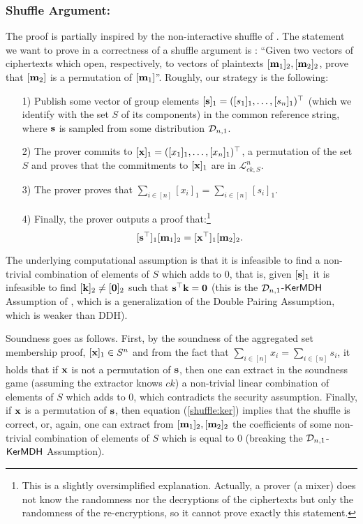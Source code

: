   \subsubsection{Shuffle Argument:} The proof is partially inspired by the non-interactive shuffle of \cite{AC:GroLu07}. The statement we want to prove in a correctness of a shuffle argument is : ``Given two vectors of ciphertexts which open, respectively, to vectors of plaintexts $[\mathbf{m}_1]_2, [\mathbf{m}_2]_2$, prove that 
 $[\mathbf{m}_2]$ is a permutation of $[\mathbf{m}_1]$''.  Roughly, our strategy is the following:  
\begin{itemize}
\item[1)] Publish some vector of group elements $[\mathbf{s}]_1 =([s_1]_1,\ldots,[s_n]_1)^\top$ (which we identify with the set $S$ of its components) in the common reference string, where $\mathbf{s}$ is sampled from some distribution $\mathcal{D}_{n,1}$.
\item[2)] The prover commits to $[\mathbf{x}]_1=([x_1]_1,\ldots,[x_n]_1)^\top$, a permutation of the set $S$ and proves that the commitments to $[\mathbf{x}]_1$ are in $\mathcal{L}^{n}_{ck,S}$.
\item[3)] The prover proves that $\sum_{i \in [n]} [x_i]_1 =\sum_{i \in [n]} [s_i]_1$.
\item[4)] Finally, the prover outputs a proof that:\footnote{This is a slightly oversimplified explanation. 
Actually, a prover (a mixer) does not know the randomness nor the decryptions of the ciphertexts but only the randomness of the re-encryptions, so it cannot prove exactly this statement.} 
\begin{equation}\label{shuffle:ker}[\mathbf{s}^{\top}]_1 [\mathbf{m}_1]_2 =[\mathbf{x}^{\top}]_1 [\mathbf{m}_2]_2.
\end{equation}
\end{itemize}
The underlying computational assumption is that it is infeasible to find a non-trivial combination of elements of $S$ which adds to $0$, that is, given $[\mathbf{s}]_1$ it is infeasible to find $[\mathbf{k}]_2 \neq [\mathbf{0}]_2$ such that
$\mathbf{s}^{\top} \mathbf{k}=\mathbf{0}$ (this is the $\mathcal{D}_{n,1}$-$\mathsf{KerMDH}$ Assumption of \cite{EPRINT:MorRafVil15}, which is a generalization of the Double Pairing Assumption, which is weaker than DDH). 

Soundness goes as follows. First, by the soundness of the aggregated set membership proof, $[\mathbf{x}]_1 \in S^{n}$ and from the fact that 
 $\sum_{i \in [n]} x_i =\sum_{i \in [n]} s_i$, it holds that if 
 $\mathbf{x}$ is not a permutation of $\mathbf{s}$, then one can extract in the soundness game (assuming the extractor knows $ck$) a non-trivial linear combination of elements of $S$ which adds to $0$, which contradicts the security assumption. 
Finally, if $\mathbf{x}$ is a permutation of $\mathbf{s}$,  then equation (\ref{shuffle:ker}) implies that the shuffle is correct, or, again, 
one can extract from   $[\mathbf{m}_1]_2,[\mathbf{m}_2]_2$ the coefficients of some non-trivial combination of elements of $S$ which is equal to $0$ (breaking the $\mathcal{D}_{n,1}$-$\mathsf{KerMDH}$ Assumption). 

